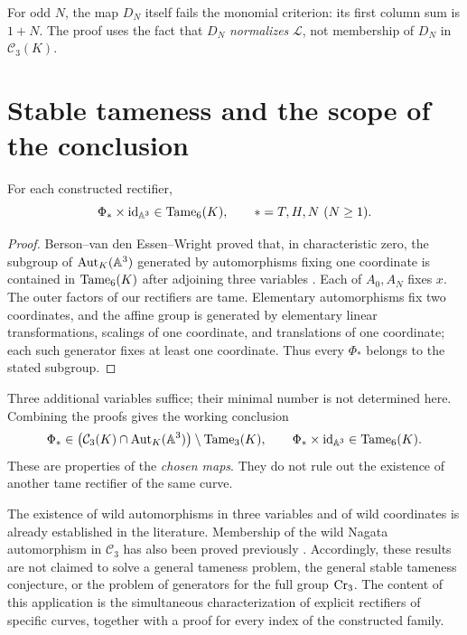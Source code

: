 \begin{remark}
For odd $N$, the map $D_N$ itself fails the monomial criterion:
its first column sum is $1+N$. The proof uses the fact that $D_N$
\emph{normalizes} $\mathcal L$, not membership of $D_N$ in
$\mathcal C_3(K)$.
\end{remark}

\section{Stable tameness and the scope of the conclusion}\label{sec:stable-tameness}

\begin{proposition}\label{prop:stable-tameness}
For each constructed rectifier,
\[
 \Phi_\ast\times\mathrm{id}_{{\mathbb A}^3}\in\operatorname{Tame}_6(K),
 \qquad \ast=T,H,N\ (N\ge1).
\]
\end{proposition}
\begin{proof}
Berson--van den Essen--Wright proved that, in characteristic zero, the
subgroup of $\operatorname{Aut}_K({\mathbb A}^3)$ generated by automorphisms fixing one
coordinate is contained in $\operatorname{Tame}_6(K)$ after adjoining three variables
\cite[Corollary~4.9]{BEW2012}.
Each of $A_0,A_N$ fixes $x$.
The outer factors of our rectifiers are tame. Elementary automorphisms
fix two coordinates, and the affine group is generated by elementary
linear transformations, scalings of one coordinate, and translations of
one coordinate; each such generator fixes at least one coordinate.
Thus every $\Phi_\ast$ belongs to the stated subgroup.
\end{proof}

Three additional variables suffice; their minimal number is not determined
here. Combining the proofs gives the working conclusion
\[
 \Phi_\ast\in
 \bigl(\mathcal C_3(K)\cap\operatorname{Aut}_K({\mathbb A}^3)\bigr)
 \setminus\operatorname{Tame}_3(K),\qquad
 \Phi_\ast\times\mathrm{id}_{{\mathbb A}^3}\in\operatorname{Tame}_6(K).
\]
These are properties of the \emph{chosen maps}. They do not rule out
the existence of another tame rectifier of the same curve.

The existence of wild automorphisms in three variables and of wild
coordinates is already established in the literature. Membership of
the wild Nagata automorphism in $\mathcal C_3$ has also been proved
previously \cite[Proposition~6.8]{BH2015}. Accordingly, these results
are not claimed to solve a general tameness problem, the general stable
tameness conjecture, or the problem of generators for the full group
$\operatorname{Cr}_3$.
The content of this application is the simultaneous characterization of
explicit rectifiers of specific curves, together with a proof for every
index of the constructed family.
